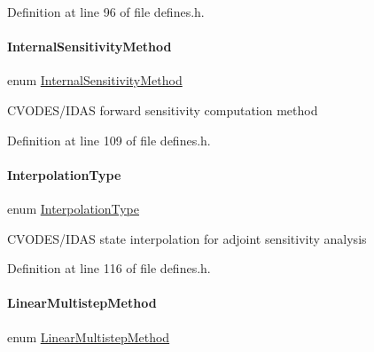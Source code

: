 Definition at line 96 of file defines.\+h.

\mbox{\label{namespaceamici_aa444c52f0a5638d68702d1ec92f8db87}} 
\paragraph{\texorpdfstring{InternalSensitivityMethod}{InternalSensitivityMethod}}
{\footnotesize\ttfamily enum \mbox{\hyperlink{namespaceamici_aa444c52f0a5638d68702d1ec92f8db87}{Internal\+Sensitivity\+Method}}\hspace{0.3cm}{\ttfamily [strong]}}

C\+V\+O\+D\+E\+S/\+I\+D\+AS forward sensitivity computation method 

Definition at line 109 of file defines.\+h.

\mbox{\label{namespaceamici_a8472f01c511d77bbfb981a46618ea1ea}} 
\paragraph{\texorpdfstring{InterpolationType}{InterpolationType}}
{\footnotesize\ttfamily enum \mbox{\hyperlink{namespaceamici_a8472f01c511d77bbfb981a46618ea1ea}{Interpolation\+Type}}\hspace{0.3cm}{\ttfamily [strong]}}

C\+V\+O\+D\+E\+S/\+I\+D\+AS state interpolation for adjoint sensitivity analysis 

Definition at line 116 of file defines.\+h.

\mbox{\label{namespaceamici_a9ebe272482a8e073efe7078b7e96e8bc}} 
\paragraph{\texorpdfstring{LinearMultistepMethod}{LinearMultistepMethod}}
{\footnotesize\ttfamily enum \mbox{\hyperlink{namespaceamici_a9ebe272482a8e073efe7078b7e96e8bc}{Linear\+Multistep\+Method}}\hspace{0.3cm}{\ttfamily [strong]}}

